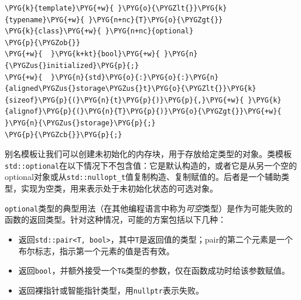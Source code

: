 \begin{codeblockbg}
\begin{Verbatim}[commandchars=\\\{\},breaklines=true,breakanywhere=true,fontsize=\codefont,xleftmargin=17bp]
\PYG{k}{template}\PYG{+w}{ }\PYG{o}{\PYGZlt{}}\PYG{k}{typename}\PYG{+w}{ }\PYG{n+nc}{T}\PYG{o}{\PYGZgt{}}
\PYG{k}{class}\PYG{+w}{ }\PYG{n+nc}{optional}
\PYG{p}{\PYGZob{}}
\PYG{+w}{  }\PYG{k+kt}{bool}\PYG{+w}{ }\PYG{n}{\PYGZus{}initialized}\PYG{p}{;}
\PYG{+w}{  }\PYG{n}{std}\PYG{o}{:}\PYG{o}{:}\PYG{n}{aligned\PYGZus{}storage\PYGZus{}t}\PYG{o}{\PYGZlt{}}\PYG{k}{sizeof}\PYG{p}{(}\PYG{n}{t}\PYG{p}{)}\PYG{p}{,}\PYG{+w}{ }\PYG{k}{alignof}\PYG{p}{(}\PYG{n}{T}\PYG{p}{)}\PYG{o}{\PYGZgt{}}\PYG{+w}{ }\PYG{n}{\PYGZus{}storage}\PYG{p}{;}
\PYG{p}{\PYGZcb{}}\PYG{p}{;}
\end{Verbatim}
\end{codeblockbg}



别名模板让我们可以创建未初始化的内存块，用于存放给定类型的对象。类模板\texttt{std::\allowbreak{}optional}在以下情况下不包含值：它是默认构造的，或者它是从另一个空的optional对象或从\texttt{std::\allowbreak{}nullopt\_\allowbreak{}t}值复制构造、复制赋值的。后者是一个辅助类型，实现为空类，用来表示处于未初始化状态的可选对象。



\texttt{optional}类型的典型用法（在其他编程语言中称为\textit{可空}类型）是作为可能失败的函数的返回类型。针对这种情况，可能的方案包括以下几种：



\begin{itemize}
\item 返回\texttt{std::\allowbreak{}pair<\allowbreak{}T, bool>}，其中\texttt{T}是返回值的类型；pair的第二个元素是一个布尔标志，指示第一个元素的值是否有效。



\item 返回\texttt{bool}，并额外接受一个\texttt{T\&}类型的参数，仅在函数成功时给该参数赋值。



\item 返回裸指针或智能指针类型，用\texttt{nullptr}表示失败。

\end{itemize}




